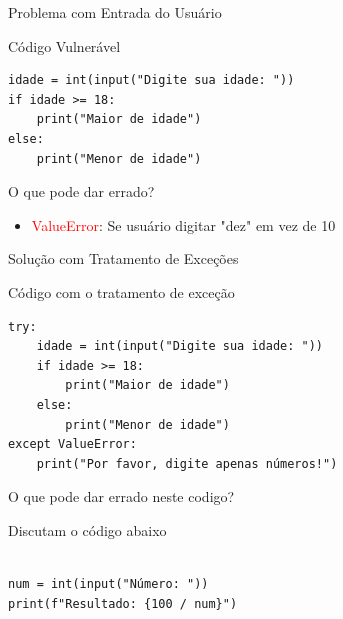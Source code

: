 \begin{frame}[fragile]{Problema com Entrada do Usuário}
    \begin{block}{Código Vulnerável}
        \begin{verbatim}
idade = int(input("Digite sua idade: "))
if idade >= 18:
    print("Maior de idade")
else:
    print("Menor de idade")
\end{verbatim}
    \end{block}

    \begin{alertblock}{O que pode dar errado?}
        \begin{itemize}
            \item \textcolor{red}{ValueError}: Se usuário digitar "dez" em vez de 10
        \end{itemize}
    \end{alertblock}


\end{frame}

\begin{frame}[fragile]{Solução com Tratamento de Exceções}
    \begin{block}{Código com o tratamento de exceção}
        \begin{verbatim}
try:
    idade = int(input("Digite sua idade: "))
    if idade >= 18:
        print("Maior de idade")
    else:
        print("Menor de idade")
except ValueError:
    print("Por favor, digite apenas números!")
\end{verbatim}
    \end{block}




\end{frame}

\begin{frame}[fragile]{O que pode dar errado neste codigo?}
    \begin{block}{Discutam o código abaixo}
        \begin{verbatim}

num = int(input("Número: "))  
print(f"Resultado: {100 / num}")        

\end{verbatim}
    \end{block}

\end{frame}

